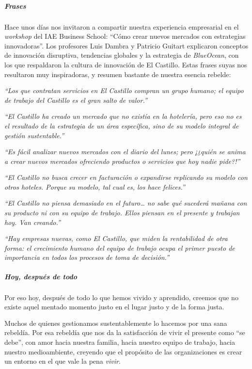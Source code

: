 \documentclass[
]{article}
\begin{document}
\hypertarget{frases}{%
\subparagraph{Frases}\label{frases}}

Hace unos días nos invitaron a compartir nuestra experiencia empresarial
en el \emph{workshop} del IAE Business School: ``Cómo crear nuevos
mercados con estrategias innovadoras''. Los profesores Luis Dambra y
Patricio Guitart explicaron conceptos de innovación disruptiva,
tendencias globales y la estrategia de \emph{BlueOcean}, con los que
respaldaron la cultura de innovación de El Castillo. Estas frases suyas
nos resultaron muy inspiradoras, y resumen bastante de nuestra esencia
rebelde:

\emph{``Los que contratan servicios en El Castillo compran un grupo
humano; el equipo de trabajo del Castillo es el gran salto de valor.''}

\emph{``El Castillo ha creado un mercado que no existía en la hotelería,
pero eso no es el resultado de la estrategia de un área específica, sino
de su modelo integral de gestión sustentable.''}

\emph{``Es fácil analizar nuevos mercados con el diario del lunes; pero
¡¿quién se anima a crear nuevos mercados ofreciendo productos o
servicios que hoy nadie pide?!''}

\emph{``El Castillo no busca crecer en facturación o expandirse
replicando su modelo con otros hoteles. Porque su modelo, tal cual es,
los hace felices.''}

\emph{``El Castillo no piensa demasiado en el futuro\ldots{} no sabe qué
sucederá mañana con su producto ni con su equipo de trabajo. Ellos
piensan en el presente y trabajan hoy. Van creando.''}

\emph{``Hay empresas nuevas, como El Castillo, que miden la rentabilidad
de otra forma: el crecimiento humano del equipo de trabajo ocupa el
primer puesto de importancia en todos los procesos de toma de
decisión.''}

\hypertarget{hoy-despuuxe9s-de-todo}{%
\subparagraph{Hoy, después de todo}\label{hoy-despuuxe9s-de-todo}}

Por eso hoy, después de todo lo que hemos vivido y aprendido, creemos
que no existe aquel mentado momento justo en el lugar justo y de la
forma justa.

Muchos de quienes gestionamos sustentablemente lo hacemos por una sana
rebeldía. Por esa rebeldía que nos da la satisfacción de vivir el
presente como ``se debe'', con amor hacia nuestra familia, hacia nuestro
equipo de trabajo, hacia nuestro medioambiente, creyendo que el
propósito de las organizaciones es crear un entorno en el que vale la
pena \emph{vivir}.
\end{document}
